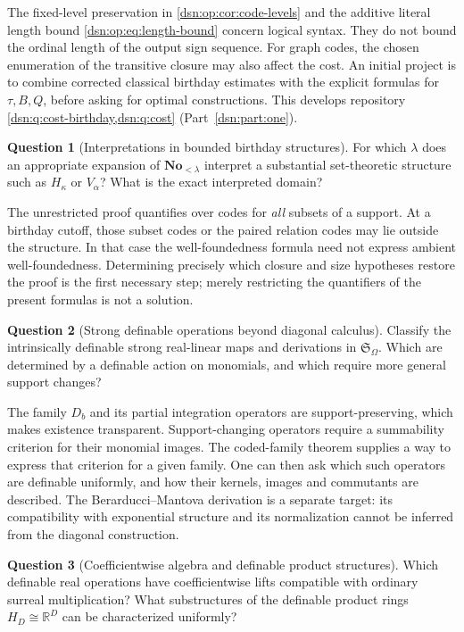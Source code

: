 \documentclass[11pt,a4paper]{article}
\numberwithin{equation}{section}
\theoremstyle{definition}
\newtheorem{question}[question]{Question}
\theoremstyle{remark}
\newcommand{\No}{\mathbf{No}}
\newcommand{\R}{\mathbb R}
\newcommand{\Somega}{\mathfrak S_\Omega}
\begin{document}
The fixed-level preservation in \cref{dsn:op:cor:code-levels} and the additive
literal length bound \eqref{dsn:op:eq:length-bound} concern logical syntax.
They do not bound the ordinal length of the output sign sequence.
For graph codes, the chosen enumeration of the transitive closure may
also affect the cost.  An initial project is to combine corrected
classical birthday estimates \cite{vdDE,vdDEerr} with the explicit
formulas for \(\tau,B,Q\), before asking for optimal constructions.
This develops repository \cref{dsn:q:cost-birthday,dsn:q:cost} (Part~\ref{dsn:part:one}).

\begin{question}[Interpretations in bounded birthday structures]
For which \(\lambda\) does an appropriate expansion of
\(\No_{<\lambda}\) interpret a substantial set-theoretic structure such
as \(H_\kappa\) or \(V_\alpha\)?  What is the exact interpreted domain?
\end{question}

The unrestricted proof quantifies over codes for \emph{all} subsets
of a support.  At a birthday cutoff, those subset codes or the paired
relation codes may lie outside the structure.  In that case the
well-foundedness formula need not express ambient well-foundedness.
Determining precisely which closure and size hypotheses restore the
proof is the first necessary step; merely restricting the quantifiers
of the present formulas is not a solution.

\begin{question}[Strong definable operations beyond diagonal calculus]
Classify the intrinsically definable strong real-linear maps and
derivations in \(\Somega\).  Which are determined by a definable
action on monomials, and which require more general support changes?
\end{question}

The family \(D_b\) and its partial integration operators are
support-preserving, which makes existence transparent.
Support-changing operators require a summability criterion for their
monomial images.  The coded-family theorem supplies a way to express
that criterion for a given family.  One can then ask which such
operators are definable uniformly, and how their kernels, images and
commutants are described.  The Berarducci--Mantova derivation is a
separate target: its compatibility with exponential structure and its
normalization cannot be inferred from the diagonal construction.

\begin{question}[Coefficientwise algebra and definable product structures]
Which definable real operations have coefficientwise lifts compatible
with ordinary surreal multiplication?  What substructures of the
definable product rings \(H_D\cong\R^D\) can be characterized uniformly?
\end{question}
\end{document}
